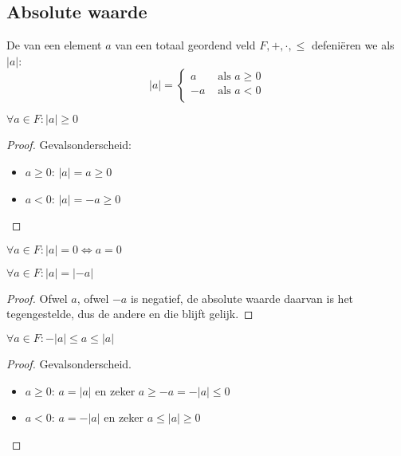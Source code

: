 \documentclass[main.tex]{subfiles}
\begin{document}
\subsection{Absolute waarde}
\label{sec:absolute-waarde}

\begin{de}
  De  van een element $a$ van een totaal geordend veld $F,+,\cdot,\le$ defeni\"eren we als $|a|$:
  \[ 
  |a| = 
  \left\{
    \begin{array}{cl}
      a &\text{ als } a\ge 0\\
      -a &\text{ als } a < 0\\
    \end{array}
  \right.
  \]
\end{de}

\begin{pr}
  \label{pr:absolute-waarde-positief}
  $\forall a\in F: |a| \ge 0$

  \begin{proof}
    Gevalsonderscheid:
    \begin{itemize}
    \item $a \ge 0$: $|a| = a \ge 0$
    \item $a < 0$: $|a| = -a \ge 0$
    \end{itemize}
  \end{proof}
\end{pr}

\begin{pr}
  $\forall a\in F: |a| = 0 \Leftrightarrow a = 0$
\end{pr}

\begin{pr}
  $\forall a\in F: |a| = |-a|$

  \begin{proof}
    Ofwel $a$, ofwel $-a$ is negatief\needed, de absolute waarde daarvan is het tegengestelde, dus de andere en die blijft gelijk.
  \end{proof}
\end{pr}

\begin{pr}
  $\forall a\in F: -|a| \le a \le |a|$
  \begin{proof}
    Gevalsonderscheid.
    \begin{itemize}
    \item $a \ge 0$: $a = |a|$ en zeker $a \ge -a = -|a| \le 0$
    \item $a <0$: $a=-|a|$ en zeker $a \le |a| \ge 0$
    \end{itemize}
  \end{proof}
\end{pr}
\end{document}
